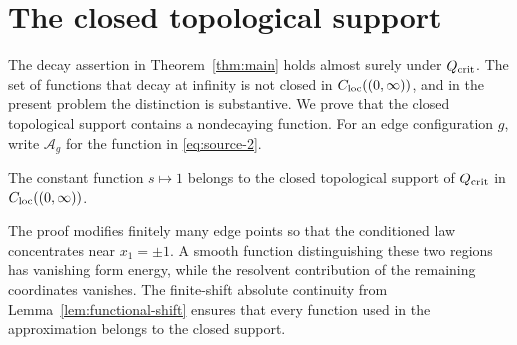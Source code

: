 \section{The closed topological support}\label{sec:support}

The decay assertion in Theorem~\ref{thm:main} holds almost surely under
$Q_{\rm crit}$.  The set of functions that decay at infinity is not closed
in $C_{\rm loc}((0,\infty))$, and in the present problem the distinction is
substantive.  We prove that the closed topological support contains a
nondecaying function.  For an edge configuration $g$, write
$\mathcal A_g$ for the function in \eqref{eq:source-2}.

\begin{proposition}\label{prop:support-constant}
The constant function $s\mapsto 1$ belongs to the closed topological
support of $Q_{\rm crit}$ in $C_{\rm loc}((0,\infty))$.
\end{proposition}

The proof modifies finitely many edge points so that the conditioned law
concentrates near $x_1=\pm1$.  A smooth function distinguishing these
two regions has vanishing form energy, while the resolvent contribution
of the remaining coordinates vanishes.  The finite-shift absolute continuity from
Lemma~\ref{lem:functional-shift} ensures that every function used in the
approximation belongs to the closed support.

